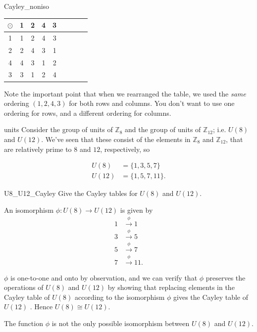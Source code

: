 \begin{example}{Cayley_noniso}
\begin{table}[H]
{\small
\begin{center}
\begin{tabular}{c|cccccccc}
$\odot$ & 1 & 2 & 4 & 3  \\
\hline
1        & 1 & 2 & 4 & 3  \\
2       & 2 & 4 & 3 & 1  \\
4       & 4 & 3 & 1 & 2 \\
3       & 3 & 1 & 2 & 4 \\

\end{tabular}
\end{center}
}
\end{table}

Note the important point that when we rearranged the table, we used the \emph{same} ordering $(1,2,4,3)$ for both rows and columns.   You don't want to use one ordering for rows, and a different ordering for columns.
\end{example} 

\begin{example}{units}
Consider  the group of units of ${\mathbb Z}_8$ and the group of units of ${\mathbb Z}_{12}$; i.e. $U(8)$ and $U(12)$.  We've seen that these  consist of the elements in ${\mathbb Z}_8$ and ${\mathbb Z}_{12}$, that are relatively prime to $8$ and $12$, respectively, so

\begin{align*}
U(8) & = \{1, 3, 5, 7 \} \\
U(12) & = \{1, 5, 7, 11 \}.
\end{align*}

\begin{exercise}{U8_U12_Cayley}
Give the Cayley tables for $U(8)$ and $U(12)$.
\end{exercise}

An isomorphism $\phi : U(8) \rightarrow U(12)$ is given by
\begin{align*}
1 & \xrightarrow{\phi}  1 \\
3 & \xrightarrow{\phi}  5 \\
5 & \xrightarrow{\phi}  7 \\
7 & \xrightarrow{\phi}  11.
\end{align*}

$\phi$ is one-to-one and onto by observation, and we can verify that $\phi$ preserves the operations of $U(8)$ and $U(12)$ by showing that replacing elements in the Cayley table of $U(8)$ according to the isomorphism $\phi$ gives the Cayley table of $U(12)$ .  Hence $U(8) \cong U(12)$.
\end{example}
The function $\phi$ is not the only possible isomorphism between $U(8)$ and $U(12)$.  


